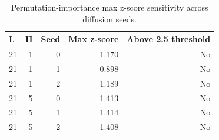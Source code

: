 \begin{table}[!htbp]
\centering
\caption{Permutation-importance max z-score sensitivity across diffusion seeds.}
\label{tab:xai-seed-sensitivity}
\begin{tabular}{lrrrr}
\toprule
L & H & Seed & Max z-score & Above 2.5 threshold \\
\midrule
21 & 1 & 0 & 1.170 & No \\
21 & 1 & 1 & 0.898 & No \\
21 & 1 & 2 & 1.189 & No \\
21 & 5 & 0 & 1.413 & No \\
21 & 5 & 1 & 1.414 & No \\
21 & 5 & 2 & 1.408 & No \\
\bottomrule
\end{tabular}
\end{table}
